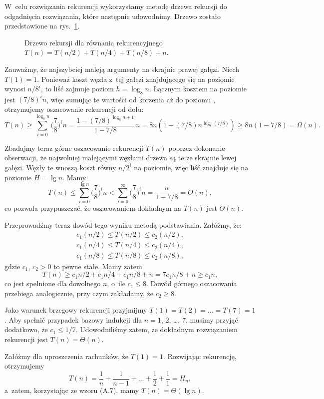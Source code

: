 \subproblem %
W~celu rozwiązania rekurencji wykorzystamy metodę drzewa rekursji do odgadnięcia rozwiązania, które następnie udowodnimy.
Drzewo zostało przedstawione na rys.\ \ref{fig:4-4f}.
\begin{figure}[ht]
	\centering 
	\caption{Drzewo rekursji dla równania rekurencyjnego $T(n)=T(n/2)+T(n/4)+T(n/8)+n$.} \label{fig:4-4f}
\end{figure}

Zauważmy, że najszybciej maleją argumenty na skrajnie prawej gałęzi.
Niech $T(1)=1$.
Ponieważ koszt węzła z~tej gałęzi znajdującego się na  poziomie wynosi $n/8^i$, to liść zajmuje poziom $h=\log_8n$.
Łącznym kosztem na  poziomie jest $(7/8)^in$, więc sumując te wartości od korzenia aż do poziomu , otrzymujemy oszacowanie rekurencji od dołu:
\[
	T(n) \ge \sum_{i=0}^{\log_8n}\biggl(\frac{7}{8}\biggr)^in = \frac{1-(7/8)^{\log_8n+1}}{1-7/8}\,n = 8n(1-(7/8)n^{\log_8(7/8)}) \ge 8n(1-7/8) = \Omega(n).
\]

Zbadajmy teraz górne oszacowanie rekurencji $T(n)$ poprzez dokonanie obserwacji, że najwolniej malejącymi węzłami drzewa są te ze skrajnie lewej gałęzi.
Węzły te wnoszą koszt równy $n/2^i$ na  poziomie, więc liść znajduje się na poziomie $H=\lg n$.
Mamy
\[
	T(n) \le \sum_{i=0}^{\lg n}\biggl(\frac{7}{8}\biggr)^in < \sum_{i=0}^\infty\biggl(\frac{7}{8}\biggr)^in = \frac{n}{1-7/8} = O(n),
\]
co pozwala przypuszczać, że oszacowaniem dokładnym na $T(n)$ jest $\Theta(n)$.

Przeprowadźmy teraz dowód tego wyniku metodą podstawiania.
Załóżmy, że:
\begin{gather*}
	c_1(n/2) \le T(n/2) \le c_2(n/2), \\
	c_1(n/4) \le T(n/4) \le c_2(n/4), \\
	c_1(n/8) \le T(n/8) \le c_2(n/8),
\end{gather*}
gdzie $c_1$, $c_2>0$ to pewne stałe.
Mamy zatem
\[
	T(n) \ge c_1n/2+c_1n/4+c_1n/8+n = 7c_1n/8+n \ge c_1n,
\]
co jest spełnione dla dowolnego $n$, o~ile $c_1\le8$.
Dowód górnego oszacowania przebiega analogicznie, przy czym zakładamy, że $c_2\ge8$.

Jako warunek brzegowy rekurencji przyjmijmy $T(1)=T(2)=\dots=T(7)=1$.
Aby spełnić przypadek bazowy indukcji dla $n=1$, 2, \dots, 7, musimy przyjąć dodatkowo, że $c_1\le1/7$.
Udowodniliśmy zatem, że dokładnym rozwiązaniem rekurencji jest $T(n)=\Theta(n)$.

\subproblem %
Załóżmy dla uproszczenia rachunków, że $T(1)=1$.
Rozwijając rekurencję, otrzymujemy
\[
	T(n) = \frac{1}{n}+\frac{1}{n-1}+\dots+\frac{1}{2}+\frac{1}{1} = H_n,
\]
a~zatem, korzystając ze wzoru (A.7), mamy $T(n)=\Theta(\lg n)$.

